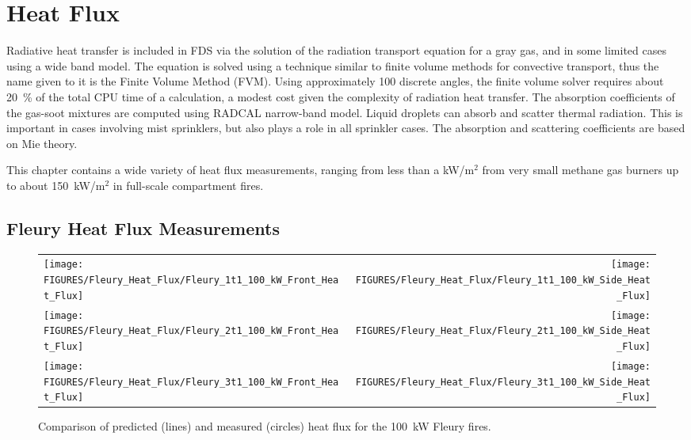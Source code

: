 \chapter{Heat Flux}

Radiative heat transfer is included in FDS via the solution of the radiation transport equation for a
gray gas, and in some limited cases using a wide band
model.  The equation is solved using a technique similar to finite
volume methods for convective transport, thus the name given to it is
the Finite Volume Method (FVM).  Using approximately 100 discrete
angles, the finite volume solver requires about 20~\% of the total CPU
time of a calculation, a modest cost given the complexity of radiation
heat transfer. The absorption coefficients of the gas-soot mixtures
are computed using RADCAL narrow-band model.  Liquid droplets can
absorb and scatter thermal radiation. This is important in cases
involving mist sprinklers, but also plays a role in all sprinkler
cases.  The absorption and scattering coefficients are based on Mie
theory.

This chapter contains a wide variety of heat flux measurements,
ranging from less than a kW/m$^2$ from very small methane gas burners
up to about 150~kW/m$^2$ in full-scale compartment fires.


\clearpage

\section{Fleury Heat Flux Measurements}



\begin{figure}[p]
\begin{tabular*}{\textwidth}{l@{\extracolsep{\fill}}r}
\texttt{[image: FIGURES/Fleury\_Heat\_Flux/Fleury\_1t1\_100\_kW\_Front\_Heat\_Flux]} &
\texttt{[image: FIGURES/Fleury\_Heat\_Flux/Fleury\_1t1\_100\_kW\_Side\_Heat\_Flux]} \\
\texttt{[image: FIGURES/Fleury\_Heat\_Flux/Fleury\_2t1\_100\_kW\_Front\_Heat\_Flux]} &
\texttt{[image: FIGURES/Fleury\_Heat\_Flux/Fleury\_2t1\_100\_kW\_Side\_Heat\_Flux]} \\
\texttt{[image: FIGURES/Fleury\_Heat\_Flux/Fleury\_3t1\_100\_kW\_Front\_Heat\_Flux]} &
\texttt{[image: FIGURES/Fleury\_Heat\_Flux/Fleury\_3t1\_100\_kW\_Side\_Heat\_Flux]} 
\end{tabular*}
\label{Fleury_Heat_Flux_100_kW}
\caption[Fleury Heat Flux, 100 kW fires.]
{Comparison of predicted (lines) and measured (circles) heat flux for the 100~kW Fleury fires.}
\end{figure}

